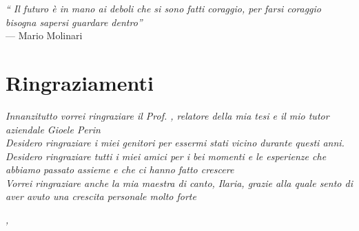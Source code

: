 \cleardoublepage
{}
{}

\begin{flushright}{
    \slshape
    ``
    Il futuro è in mano ai deboli che si sono fatti coraggio, per farsi coraggio bisogna sapersi guardare dentro''} \\
    \medskip
    --- Mario Molinari
\end{flushright}


\bigskip

\begingroup
\let\clearpage\relax
\let\cleardoublepage\relax
\let\cleardoublepage\relax

\chapter*{Ringraziamenti}

\noindent \textit{Innanzitutto vorrei ringraziare il Prof. \myProf, relatore della mia tesi e il mio tutor aziendale Gioele Perin}\\

\noindent \textit{Desidero ringraziare i miei genitori per essermi stati vicino durante questi anni.}\\

\noindent \textit{Desidero ringraziare tutti i miei amici per i bei momenti e le esperienze che abbiamo passato assieme e che ci hanno fatto crescere}\\

\noindent \textit{Vorrei ringraziare anche la mia maestra di canto, Ilaria, grazie alla quale sento di aver avuto una crescita personale molto forte}\\


\bigskip

\noindent\textit{\myLocation, \myTime}
\hfill \myName

\endgroup
